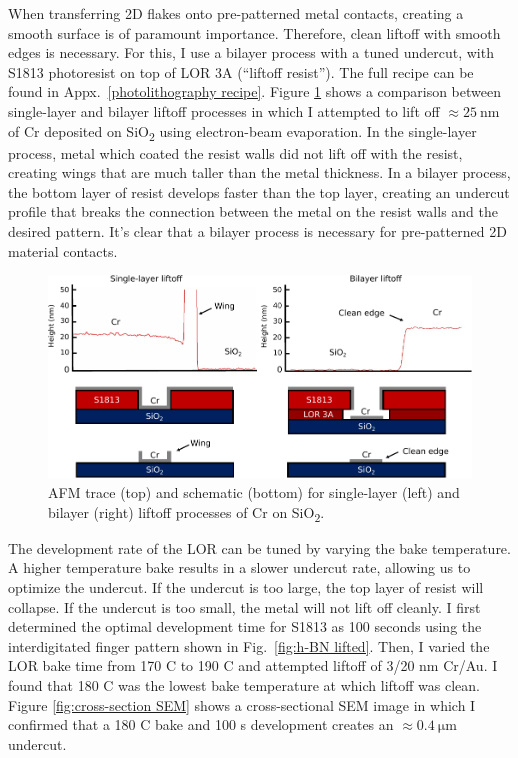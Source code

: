 \documentclass[double,12pt,1in,seploa]{beavtex}
\begin{document}
When transferring 2D flakes onto pre-patterned metal contacts, creating a smooth surface is of paramount importance. Therefore, clean liftoff with smooth edges is necessary. For this, I use a bilayer process with a tuned undercut, with S1813 photoresist on top of LOR 3A (“liftoff resist”). The full recipe can be found in Appx.\ \ref{photolithography recipe}. Figure \ref{fig:Liftoff AFM} shows a comparison between single-layer and bilayer liftoff processes in which I attempted to lift off $\approx \SI{25}{\nano\meter}$ of Cr deposited on SiO\textsubscript{2} using electron-beam evaporation. In the single-layer process, metal which coated the resist walls did not lift off with the resist, creating wings that are much taller than the metal thickness. In a bilayer process, the bottom layer of resist develops faster than the top layer, creating an undercut profile that breaks the connection between the metal on the resist walls and the desired pattern. It’s clear that a bilayer process is necessary for pre-patterned 2D material contacts. 




\begin{figure}
    \includegraphics[width = 1\textwidth]{liftoff AFM traces comparison.pdf}
    \caption{AFM trace (top) and schematic (bottom) for single-layer (left) and bilayer (right) liftoff processes of Cr on SiO\textsubscript{2}.}
    \label{fig:Liftoff AFM}
\end{figure}

The development rate of the LOR can be tuned by varying the bake temperature. A higher temperature bake results in a slower undercut rate, allowing us to optimize the undercut. If the undercut is too large, the top layer of resist will collapse. If the undercut is too small, the metal will not lift off cleanly. I first determined the optimal development time for S1813 as 100 seconds using the interdigitated finger pattern shown in Fig.\ \ref{fig:h-BN lifted}. Then, I varied the LOR bake time from 170 C to 190 C and attempted liftoff of 3/20 nm Cr/Au. I found that 180 C was the lowest bake temperature at which liftoff was clean. Figure \ref{fig:cross-section SEM} shows a cross-sectional SEM image in which I confirmed that a 180 C bake and 100 s development creates an $\approx \SI{0.4}{\micro\meter}$ undercut.
\end{document}
